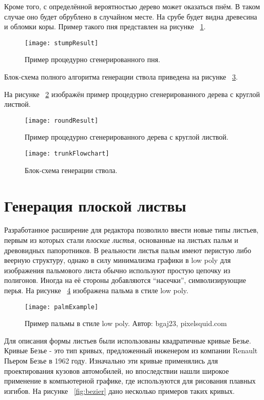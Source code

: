 Кроме того, с определённой вероятностью дерево может оказаться пнём. В таком случае оно будет обрублено в случайном месте. На срубе будет видна древесина и обломки коры. Пример такого пня представлен на рисунке ~\ref{fig:stumpResult}.

\begin{figure}[!htb]
    \centering
    \texttt{[image: stumpResult]}
    \caption{Пример процедурно сгенерированного пня.}
    \label{fig:stumpResult}
\end{figure}

Блок-схема полного алгоритма генерации ствола приведена на рисунке ~\ref{fig:trunkFlowchart}.

На рисунке ~\ref{fig:roundResult} изображён пример процедурно сгенерированного дерева с круглой листвой.

\begin{figure}[!htb]
    \centering
    \texttt{[image: roundResult]}
    \caption{Пример процедурно сгенерированного дерева с круглой листвой.}
    \label{fig:roundResult}
\end{figure}

\begin{figure}[!htb]
    \centering
    \texttt{[image: trunkFlowchart]}
    \caption{Блок-схема генерации ствола.}
    \label{fig:trunkFlowchart}
\end{figure}

\section{Генерация плоской листвы}
Разработанное расширение для редактора позволило ввести новые типы листьев, первым из которых стали \emph{плоские листья}, основанные на листьях пальм и древовидных папоротников. В реальности листья пальм имеют перистую либо веерную структуру, однако в силу минимализма графики в low poly для изображения пальмового листа обычно используют простую цепочку из полигонов. Иногда на её стороны добавляются ``насечки'', символизирующие перья. На рисунке ~\ref{fig:palmExample} изображена пальма в стиле low poly.

\begin{figure}[!htb]
    \centering
    \texttt{[image: palmExample]}
    \caption{Пример пальмы в стиле low poly. Автор: bgaj23, pixelsquid.com}
    \label{fig:palmExample}
\end{figure}

Для описания формы листьев были использованы квадратичные кривые Безье.  Кривые Безье - это тип кривых, предложенный инженером из компании Renault Пьером Безье в 1962 году. Изначально эти кривые применялись для проектирования кузовов автомобилей, но впоследствии нашли широкое применение в компьютерной графике, где используются для рисования плавных изгибов. На рисунке ~\ref{fig:bezier} дано несколько примеров таких кривых. 

